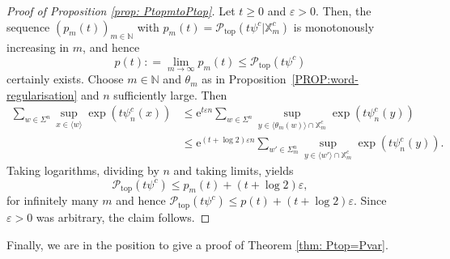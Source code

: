 \documentclass[11pt,reqno]{amsart}
\theoremstyle{plain}
\theoremstyle{definition}
\newcommand{\N}{{\mathbb N}}
\newcommand{\mc}{\mathcal}
\newcommand{\me}{\mathrm{e}}
\begin{document}
\begin{proof}[Proof of Proposition \ref{prop: PtopmtoPtop}]
Let $t \geqslant 0$ and $\varepsilon > 0$. Then, the sequence $(p_m(t))_{m \in \N}$ with $p_m(t) = \mc P_{\operatorname{top}} (t \psi^c | \mathbb{X}^c_m)$ is monotonously increasing in $m$, and hence 
\[
p(t): = \lim_{m \to \infty} p_m(t) \leqslant \mc P_{\operatorname{top}}(t \psi^c) 
\]
certainly exists. Choose $m \in \N$ and $\theta_m$ as in Proposition~\ref{PROP:word-regularisation} and $n$ sufficiently large. Then
\begin{align*}
\sum_{w \in \Sigma^n} \sup_{x \in \langle w \rangle} \exp(t \psi^c_n(x))
& \leqslant \me^{ t \varepsilon n} \sum_{w \in \Sigma^n} \sup_{y \in \langle \theta_m(w)  \rangle \cap \mathbb{X}_m^c} \exp(t \psi^c_n(y))
\\ &\leqslant \me^{(t+\log 2) \varepsilon n} \sum_{w' \in \Sigma^n_m} \sup_{y \in \langle w' \rangle \cap \mathbb{X}_m^c } \exp(t\psi^c_n(y)).
\end{align*}
Taking logarithms, dividing by $n$ and taking limits, yields
\[
\mc P_{\operatorname{top}}(t \psi^c) \leqslant p_m(t)   + (t+\log 2) \varepsilon,
\]
for infinitely many $m$ and hence $\mc P_{\operatorname{top}}(t \psi^c) \leqslant p(t) + (t+\log 2) \varepsilon$. Since $\varepsilon>0$ was arbitrary, the claim follows.
\end{proof}







Finally, we are in the position to give a proof of Theorem \ref{thm: Ptop=Pvar}.
\end{document}
